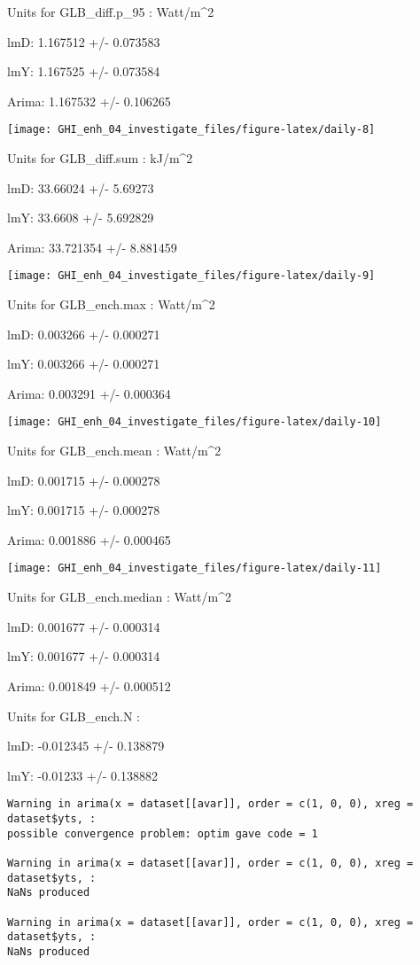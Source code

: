 \documentclass[
  10pt,
  a4paper,oneside]{article}
\begin{document}
Units for GLB\_diff.p\_95 : Watt/m\^{}2

lmD: 1.167512 +/- 0.073583

lmY: 1.167525 +/- 0.073584

Arima: 1.167532 +/- 0.106265

\begin{center}\texttt{[image: GHI\_enh\_04\_investigate\_files/figure-latex/daily-8]} \end{center}

Units for GLB\_diff.sum : kJ/m\^{}2

lmD: 33.66024 +/- 5.69273

lmY: 33.6608 +/- 5.692829

Arima: 33.721354 +/- 8.881459

\begin{center}\texttt{[image: GHI\_enh\_04\_investigate\_files/figure-latex/daily-9]} \end{center}

Units for GLB\_ench.max : Watt/m\^{}2

lmD: 0.003266 +/- 0.000271

lmY: 0.003266 +/- 0.000271

Arima: 0.003291 +/- 0.000364

\begin{center}\texttt{[image: GHI\_enh\_04\_investigate\_files/figure-latex/daily-10]} \end{center}

Units for GLB\_ench.mean : Watt/m\^{}2

lmD: 0.001715 +/- 0.000278

lmY: 0.001715 +/- 0.000278

Arima: 0.001886 +/- 0.000465

\begin{center}\texttt{[image: GHI\_enh\_04\_investigate\_files/figure-latex/daily-11]} \end{center}

Units for GLB\_ench.median : Watt/m\^{}2

lmD: 0.001677 +/- 0.000314

lmY: 0.001677 +/- 0.000314

Arima: 0.001849 +/- 0.000512

Units for GLB\_ench.N :

lmD: -0.012345 +/- 0.138879

lmY: -0.01233 +/- 0.138882

\begin{verbatim}
Warning in arima(x = dataset[[avar]], order = c(1, 0, 0), xreg = dataset$yts, :
possible convergence problem: optim gave code = 1

Warning in arima(x = dataset[[avar]], order = c(1, 0, 0), xreg = dataset$yts, :
NaNs produced

Warning in arima(x = dataset[[avar]], order = c(1, 0, 0), xreg = dataset$yts, :
NaNs produced
\end{verbatim}
\end{document}
